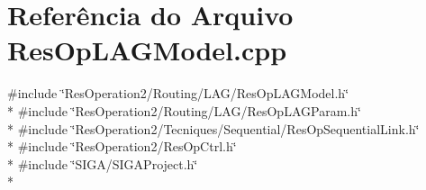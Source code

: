 \section{Referência do Arquivo Res\+Op\+L\+A\+G\+Model.\+cpp}
\label{_res_op_l_a_g_model_8cpp}
{\ttfamily \#include \char`\"{}Res\+Operation2/\+Routing/\+L\+A\+G/\+Res\+Op\+L\+A\+G\+Model.\+h\char`\"{}}\\*
{\ttfamily \#include \char`\"{}Res\+Operation2/\+Routing/\+L\+A\+G/\+Res\+Op\+L\+A\+G\+Param.\+h\char`\"{}}\\*
{\ttfamily \#include \char`\"{}Res\+Operation2/\+Tecniques/\+Sequential/\+Res\+Op\+Sequential\+Link.\+h\char`\"{}}\\*
{\ttfamily \#include \char`\"{}Res\+Operation2/\+Res\+Op\+Ctrl.\+h\char`\"{}}\\*
{\ttfamily \#include \char`\"{}S\+I\+G\+A/\+S\+I\+G\+A\+Project.\+h\char`\"{}}\\*
